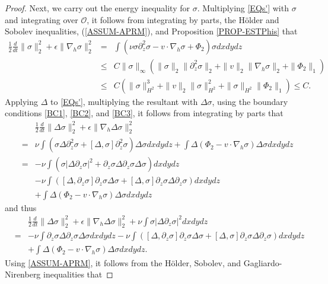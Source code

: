 \documentclass[12pt,reqno]{amsart}
\numberwithin{equation}{section}
\begin{document}
\begin{proof}
Next, we carry out the energy inequality for $\sigma$. Multiplying \eqref{EQs'} with $\sigma$
and integrating over $\mathcal O$, it follows from integrating
by parts, the H\"older and Sobolev inequalities, (\ref{ASSUM-APRM}), and Proposition \ref{PROP-ESTPhis} that
\begin{eqnarray}
  \frac12\frac{d}{dt}\|\sigma\|_2^2+\epsilon\|\nabla_h\sigma\|_2^2
  &=&\int(\nu\sigma\partial_z^2\sigma-v\cdot\nabla_h\sigma+\Phi_2)\sigma dxdydz\nonumber \\
  &\leq& C\|\sigma\|_\infty(\|\sigma\|_2\|\partial_z^2\sigma\|_2+\|v\|_2\|\nabla_h\sigma\|_2+\|\Phi_2\|_1)\nonumber\\
  &\leq& C(\|\sigma\|_{H^2}^3+\|v\|_2\|\sigma\|_{H^2}^2+\|\sigma\|_{H^2}\|\Phi_2\|_1)\leq C. \label{EQ23}
\end{eqnarray}
Applying $\Delta$ to \eqref{EQs'}, multiplying the resultant with $\Delta\sigma$, using the boundary conditions \eqref{BC1}, \eqref{BC2}, and \eqref{BC3},
it follows from integrating by parts that
\begin{eqnarray*}
  &&\frac12\frac{d}{dt}\|\Delta\sigma\|_2^2+\epsilon\|\nabla_h\Delta\sigma\|_2^2 \nonumber\\
  &=&\nu\int(\sigma\Delta\partial_z^2\sigma+[\Delta,\sigma]\partial_z^2\sigma)\Delta\sigma dxdydz+\int\Delta(\Phi_2-v\cdot\nabla_h\sigma)\Delta\sigma dxdydz\nonumber\\
  &=&-\nu\int(\sigma|\Delta\partial_z\sigma|^2+\partial_z\sigma\Delta\partial_z\sigma\Delta\sigma)dxdydz\nonumber\\
  &&-\nu\int([\Delta,\partial_z\sigma]\partial_z\sigma\Delta\sigma+
  [\Delta,\sigma]\partial_z\sigma\Delta\partial_z\sigma) dxdydz\nonumber\\
  &&+\int\Delta(\Phi_2-v\cdot\nabla_h\sigma)\Delta\sigma dxdydz
\end{eqnarray*}
and thus
\begin{eqnarray}
  &&\frac12\frac{d}{dt}\|\Delta\sigma\|_2^2+\epsilon\|\nabla_h\Delta\sigma\|_2^2+\nu\int\sigma|\Delta\partial_z\sigma|^2dxdydz \nonumber\\
  &=&-\nu\int \partial_z\sigma\Delta\partial_z\sigma\Delta\sigma dxdydz
 -\nu\int([\Delta,\partial_z\sigma]\partial_z\sigma\Delta\sigma+
  [\Delta,\sigma]\partial_z\sigma\Delta\partial_z\sigma) dxdydz\nonumber\\
  &&+\int\Delta(\Phi_2-v\cdot\nabla_h\sigma)\Delta\sigma dxdydz.\label{EQ25}
\end{eqnarray}
Using \eqref{ASSUM-APRM}, it follows from the H\"older, Sobolev, and Gagliardo-Nirenberg inequalities that

\end{proof}
\end{document}
